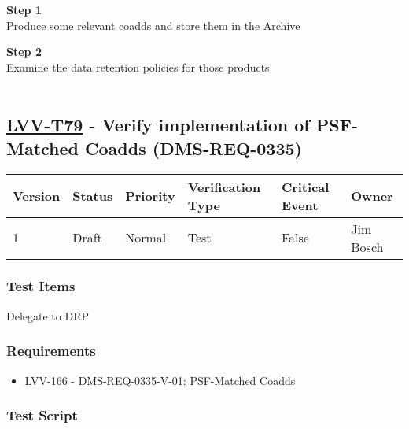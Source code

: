 \textbf{Step 1}\\

\hypertarget{description-val}{}
Produce some relevant coadds and store them in the Archive

\textbf{Step 2}\\
Examine the data retention policies for those products\\
~\\

\hypertarget{lvv-t79---verify-implementation-of-psf-matched-coadds-dms-req-0335}{%
\subsection{\texorpdfstring{\href{https://jira.lsstcorp.org/secure/Tests.jspa\#/testCase/LVV-T79}{LVV-T79}
- Verify implementation of PSF-Matched Coadds
(DMS-REQ-0335)}{LVV-T79 - Verify implementation of PSF-Matched Coadds (DMS-REQ-0335)}}\label{lvv-t79---verify-implementation-of-psf-matched-coadds-dms-req-0335}}

\begin{longtable}[]{@{}llllll@{}}
\toprule
Version & Status & Priority & Verification Type & Critical Event &
Owner\tabularnewline
\midrule
\endhead
1 & Draft & Normal & Test & False & Jim Bosch\tabularnewline
\bottomrule
\end{longtable}

\hypertarget{test-items-55}{%
\subsubsection{Test Items}\label{test-items-55}}

Delegate to DRP

\hypertarget{requirements-56}{%
\subsubsection{Requirements}\label{requirements-56}}

\begin{itemize}
\tightlist
\item
  \href{https://jira.lsstcorp.org/browse/LVV-166}{LVV-166} -
  DMS-REQ-0335-V-01: PSF-Matched Coadds
\end{itemize}

\hypertarget{test-script-56}{%
\subsubsection{Test Script}\label{test-script-56}}

